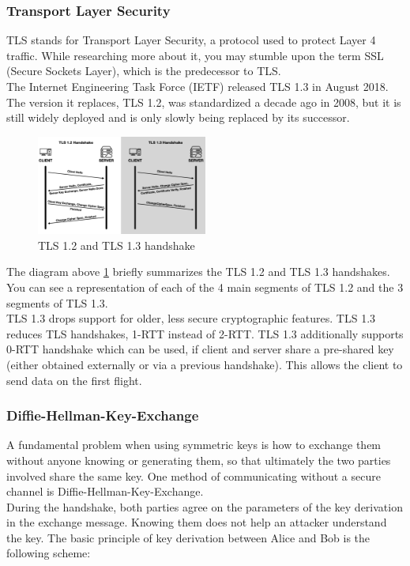 \subsubsection{Transport Layer Security}\cite{b38}
TLS stands for Transport Layer Security, a protocol used to protect Layer 4 traffic. 
While researching more about it, you may stumble upon the term SSL (Secure Sockets Layer), 
which is the predecessor to TLS.
\\
The Internet Engineering Task Force (IETF) released TLS 1.3 in August 2018. The version it 
replaces, TLS 1.2, was standardized a decade ago in 2008, but it is still widely deployed 
and is only slowly being replaced by its successor.
\begin{figure}[H] %
    \centering %
    \includegraphics[width=0.5\textwidth]{figures/TLS.png} %
    \caption{TLS 1.2 and TLS 1.3 handshake} %
    \label{Fig.2: TLS 1.2 and TLS 1.3 handshake} %
\end{figure}
The diagram above \ref{Fig.2: TLS 1.2 and TLS 1.3 handshake} briefly summarizes the 
TLS 1.2 and TLS 1.3 handshakes. You can see a 
representation of each of the 4 main segments of TLS 1.2 and the 3 segments of TLS 1.3.
\\
TLS 1.3 drops support for older, less secure cryptographic features. TLS 1.3 reduces 
TLS handshakes, 1-RTT instead of 2-RTT. TLS 1.3 additionally supports 0-RTT handshake 
which can be used, if client and server share a pre-shared key (either obtained externally 
or via a previous handshake). This allows the client to send data on the first flight.

\subsubsection{Diﬃe-Hellman-Key-Exchange}\cite{b38}
A fundamental problem when using symmetric keys is how to exchange them without anyone 
knowing or generating them, so that ultimately the two parties involved share the same 
key. One method of communicating without a secure channel is Diﬃe-Hellman-Key-Exchange.
\\
During the handshake, both parties agree on the parameters of the key derivation in the 
exchange message. Knowing them does not help an attacker understand the key. The basic 
principle of key derivation between Alice and Bob is the following scheme:

